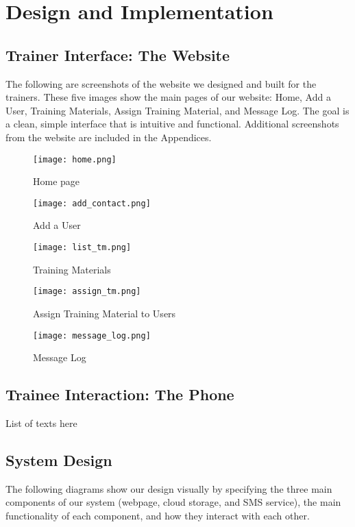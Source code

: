 \chapter{Design and Implementation}

\section{Trainer Interface: The Website}
The following are screenshots of the website we designed and built for the trainers. These five images show the main pages of our website: Home, Add a User, Training Materials, Assign Training Material, and Message Log. The goal is a clean, simple interface that is intuitive and functional. Additional screenshots from the website are included in the Appendices.

\begin{figure}
	\centering
	\texttt{[image: home.png]}
	\caption{Home page}
\end{figure}

\begin{figure}
	\centering
	\texttt{[image: add\_contact.png]}
	\caption{Add a User}
\end{figure}

\begin{figure}
	\centering
	\texttt{[image: list\_tm.png]}
	\caption{Training Materials}
\end{figure}

\begin{figure}
	\centering
	\texttt{[image: assign\_tm.png]}
	\caption{Assign Training Material to Users}
\end{figure}

\begin{figure}
	\centering
	\texttt{[image: message\_log.png]}
	\caption{Message Log}
\end{figure}


\section{Trainee Interaction: The Phone}
List of texts here

\section{System Design}
The following diagrams show our design visually by specifying the three main components of our system (webpage, cloud storage, and SMS service), the main functionality of each component, and how they interact with each other.

